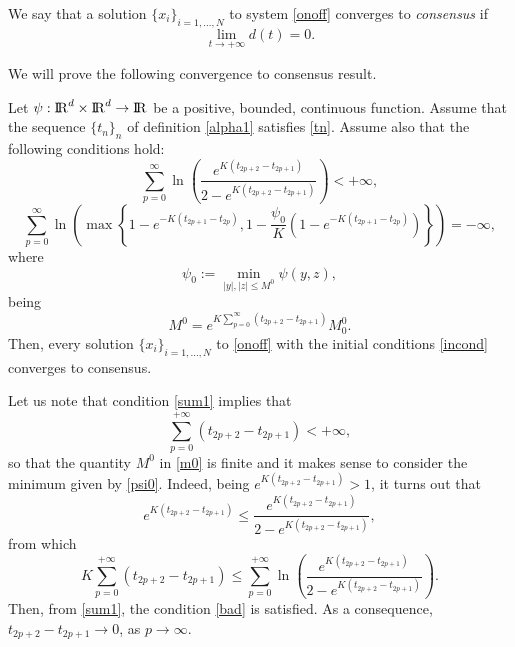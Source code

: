 \documentclass[a4paper,11pt,oneside]{article}
\newcommand{\RR}{{{\rm I} \kern -.15em {\rm R} }}
\begin{document}
	\begin{defn}\label{consensus}
		We say that a solution $\{x_{i}\}_{i=1,\dots,N}$ to system \eqref{onoff} converges to \textit{consensus} if $$\lim_{t\to+\infty}d(t)=0.$$
	\end{defn}
	We will prove the following convergence to consensus result.
	\begin{thm}\label{cons}
		Let $\psi:\RR^d\times \RR^d\rightarrow\RR$ be a positive, bounded, continuous function. Assume that the sequence $\{t_{n}\}_{n}$ of definition \eqref{alpha1} satisfies \eqref{tn}. Assume also that the following conditions hold:
		\begin{equation}\label{sum1}
			\sum_{p=0}^{\infty}\ln\left(\frac{e^{K(t_{2p+2}-t_{2p+1})}}{2-e^{K(t_{2p+2}-t_{2p+1})}}\right)<+\infty,
		\end{equation}
	\begin{equation}\label{sum2}
		\sum_{p=0}^{\infty}\ln\left(\max\left\{1-e^{-K(t_{2p+1}-t_{2p})},1-\frac{\psi_{0}}{K}(1-e^{-K(t_{2p+1}-t_{2p})})\right\}\right)=-\infty,
	\end{equation} 
where
\begin{equation}\label{psi0}
	 \psi_{0}:=\min_{\lvert y\rvert,\lvert z\rvert\leq M^{0}} \psi(y,z),
\end{equation}
being 
\begin{equation}\label{m0}
	M^{0}=e^{K\sum_{p=0}^{\infty}(t_{2p+2}-t_{2p+1})}M^{0}_{0}.
\end{equation}Then, every solution $\{x_{i}\}_{i=1,\dots,N}$ to \eqref{onoff} with the initial conditions \eqref{incond} converges to consensus.
		\end{thm}
	\begin{oss}
		Let us note that condition \eqref{sum1} implies that \begin{equation}\label{bad}
			\sum_{p=0}^{+\infty}(t_{2p+2}-t_{2p+1})<+\infty,
		\end{equation}
		so that the quantity $M^{0}$ in \eqref{m0} is finite and it makes sense to consider the minimum given by \eqref{psi0}. Indeed, being $e^{K(t_{2p+2}-t_{2p+1})}>1$, it turns out that $$e^{K(t_{2p+2}-t_{2p+1})}\leq \frac{e^{K(t_{2p+2}-t_{2p+1})}}{2-e^{K(t_{2p+2}-t_{2p+1})}},$$
		from which $$K\sum_{p=0}^{+\infty}(t_{2p+2}-t_{2p+1})\leq \sum_{p=0}^{+\infty}\ln\left(\frac{e^{K(t_{2p+2}-t_{2p+1})}}{2-e^{K(t_{2p+2}-t_{2p+1})}}\right).$$
		Then, from \eqref{sum1}, the condition \eqref{bad} is satisfied. As a consequence, $t_{2p+2}-t_{2p+1}\to 0$, as $p\to \infty$. 
		
	\end{oss}
\end{document}
